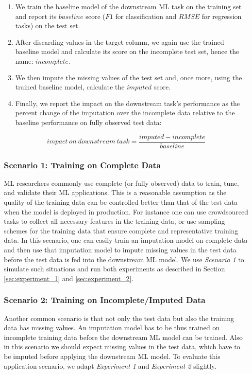 \begin{enumerate}
\item We train the baseline model of the downstream ML task on the training set and report its $baseline$ score ($F1$ for classification and $RMSE$ for regression tasks) on the test set.
\item After discarding values in the target column, we again use the trained baseline model and calculate its score on the incomplete test set, hence the name: $incomplete$.
\item We then impute the missing values of the test set and, once more, using the trained baseline model, calculate the $imputed$ score.
\item Finally, we report the impact on the downstream task's performance as the percent change of the imputation over the incomplete data relative to the baseline performance on fully observed test data:
\end{enumerate}
%
\begin{equation}
	impact\ on \ downstream\ task = \frac{imputed - incomplete}{baseline}
	\label{eq:impact}
\end{equation}
%



\subsubsection{Scenario 1: Training on Complete Data}
\label{sec:scenario_1}
%
ML researchers commonly use complete (or fully observed) data to train, tune, and validate their ML applications. This is a reasonable assumption as the quality of the training data can be controlled better than that of the test data when the model is deployed in production. For instance one can use crowdsourced tasks to collect all necessary features in the training data, or use sampling schemes for the training data that ensure complete and representative training data. In this scenario, one can easily train an imputation model on complete data and then use that imputation model to impute missing values in the test data before the test data is fed into the downstream ML model. We use \emph{Scenario 1} to simulate such situations and run both experiments as described in Section \ref{sec:experiment_1} and \ref{sec:experiment_2}.

\subsubsection{Scenario 2: Training on Incomplete/Imputed Data}
\label{sec:scenario_2}
%
Another common scenario is that not only the test data but also the training data has missing values. An imputation model has to be thus trained on incomplete training data before the downstream ML model can be trained. Also in this scenario we should expect missing values in the test data, which have to be imputed before applying the downstream ML model. To evaluate this application scenario, we adapt \emph{Experiment 1} and \emph{Experiment 2} slightly.

